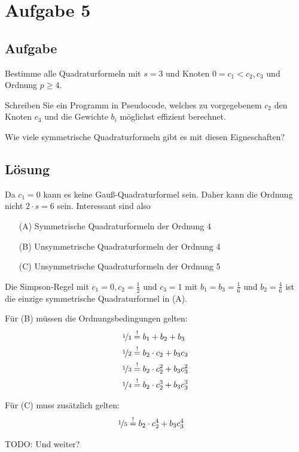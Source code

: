 \section*{Aufgabe 5}
\subsection*{Aufgabe}
Bestimme alle Quadraturformeln mit $s=3$ und Knoten
$0 = c_1 < c_2, c_3$ und Ordnung $p \geq 4$.

Schreiben Sie ein Programm in Pseudocode, welches zu vorgegebenem
$c_2$ den Knoten $c_3$ und die Gewichte $b_i$ möglichst effizient 
berechnet.

Wie viele symmetrische Quadraturformeln gibt es mit diesen Eigneschaften?

\subsection*{Lösung}
Da $c_1 = 0$ kann es keine Gauß-Quadraturformel sein. Daher kann 
die Ordnung nicht $2 \cdot s = 6$ sein. Interessant sind also 
\begin{itemize}
    \item[(A)] Symmetrische Quadraturformeln der Ordnung 4
    \item[(B)] Unsymmetrische Quadraturformeln der Ordnung 4
    \item[(C)] Unsymmetrische Quadraturformeln der Ordnung 5
\end{itemize}

Die Simpson-Regel mit $c_1 = 0, c_2 = \frac{1}{2}$ und $c_3 = 1$
mit $b_1 = b_3 = \frac{1}{6}$ und $b_2 = \frac{4}{6}$ ist die einzige
symmetrische Quadraturformel in (A).

Für (B) müssen die Ordnungsbedingungen gelten:
\begin{align}
    \nicefrac{1}{1} &\stackrel{!}{=} b_1 + b_2 + b_3\\
    \nicefrac{1}{2} &\stackrel{!}{=} b_2 \cdot c_2 + b_3 c_3\\
    \nicefrac{1}{3} &\stackrel{!}{=} b_2 \cdot c_2^2 + b_3 c_3^2\\
    \nicefrac{1}{4} &\stackrel{!}{=} b_2 \cdot c_2^3 + b_3 c_3^3
\end{align}

Für (C) muss zusätzlich gelten:
\begin{align}
    \nicefrac{1}{5} &\stackrel{!}{=} b_2 \cdot c_2^4 + b_3 c_3^4
\end{align}

TODO: Und weiter?
